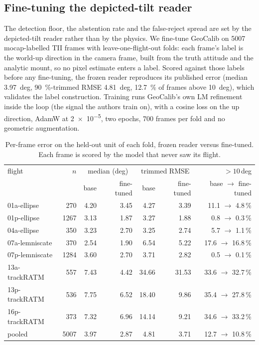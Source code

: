 
\subsection{Fine-tuning the depicted-tilt reader}
\label{sec:g03-reader}

The detection floor, the abstention rate and the false-reject spread are set by the depicted-tilt
reader rather than by the physics. We fine-tune GeoCalib on \num{5007} mocap-labelled TII frames
with leave-one-flight-out folds: each frame's label is the world-up direction in the camera
frame, built from the truth attitude and the analytic mount, so no pixel estimate enters a label.
Scored against those labels before any fine-tuning, the frozen reader reproduces its published
error (median \SI{3.97}{deg}, \SI{90}{\percent}-trimmed RMSE \SI{4.81}{deg}, \SI{12.7}{\percent}
of frames above \SI{10}{deg}), which validates the label construction. Training runs GeoCalib's
own LM refinement inside the loop (the signal the authors train on), with a cosine loss on the up
direction, AdamW at \num{2e-5}, two epochs, 700 frames per fold and no geometric augmentation.

\begin{table}[t]
\centering
\caption{Per-frame error on the held-out unit of each fold, frozen reader versus fine-tuned.
Each frame is scored by the model that never saw its flight.}
\label{tab:g03-reader}
\begin{tabular}{lrrrrrr}
\toprule
flight & $n$ & \multicolumn{2}{c}{median (deg)} & \multicolumn{2}{c}{trimmed RMSE} & $>10$\,deg \\
 & & base & fine-tuned & base & fine-tuned & base $\to$ fine-tuned \\
\midrule
01a-ellipse & 270 & 4.20 & 3.45 & 4.27 & 3.39 & 11.1 $\to$ 4.8\,\% \\
01p-ellipse & 1267 & 3.13 & 1.87 & 3.27 & 1.88 & 0.8 $\to$ 0.3\,\% \\
04a-ellipse & 350 & 3.23 & 2.70 & 3.25 & 2.74 & 5.7 $\to$ 1.1\,\% \\
07a-lemniscate & 370 & 2.54 & 1.90 & 6.54 & 5.22 & 17.6 $\to$ 16.8\,\% \\
07p-lemniscate & 1284 & 3.60 & 2.70 & 3.71 & 2.82 & 0.5 $\to$ 0.1\,\% \\
13a-trackRATM & 557 & 7.43 & 4.42 & 34.66 & 31.53 & 33.6 $\to$ 32.7\,\% \\
13p-trackRATM & 536 & 7.75 & 6.52 & 18.40 & 9.86 & 35.4 $\to$ 27.8\,\% \\
16p-trackRATM & 373 & 7.32 & 6.96 & 14.14 & 9.21 & 34.6 $\to$ 33.2\,\% \\
\midrule
pooled & 5007 & 3.97 & 2.87 & 4.81 & 3.71 & 12.7 $\to$ 10.8\,\% \\
\bottomrule
\end{tabular}
\end{table}

